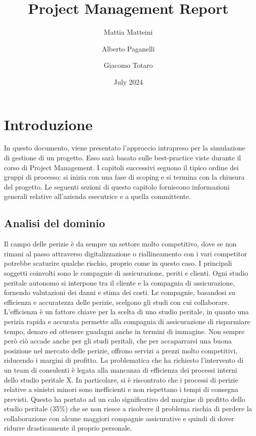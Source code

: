 \documentclass[a4paper,12pt, openright]{report}
\title{Project Management Report}
\author{
    Mattia Matteini \\ \emailaddr{mattia.matteini@studio.unibo.it}
    \and
    Alberto Paganelli \\ \emailaddr{alberto.paganelli3@studio.unibo.it}
    \and
    Giacomo Totaro \\ \emailaddr{giacomo.totaro2@studio.unibo.it}
}
\date{July 2024}
\begin{document}
\maketitle

\tableofcontents

\clearpage


\chapter{Introduzione}
In questo documento, viene presentato l'approccio intrapreso per la simulazione di gestione di un progetto. Esso sarà basato sulle best-practice viste durante il corso di Project Management.
I capitoli successivi seguono il tipico ordine dei gruppi di processo: si inizia con una fase di scoping e si termina con la chiusura del progetto.
Le seguenti sezioni di questo capitolo forniscono informazioni generali relative all’azienda esecutrice e a quella committente.

\section{Analisi del dominio}

Il campo delle perizie è da sempre un settore molto competitivo, dove se non rimani al passo attraverso digitalizzazione o riallineamento con i vari competitor potrebbe scaturire qualche rischio, proprio come in questo caso. I principali soggetti coinvolti sono le compagnie di assicurazione, periti e clienti.
Ogni studio peritale autonomo si interpone tra il cliente e la compagnia di assicurazione, fornendo valutazioni dei danni e stima dei costi.
Le compagnie, basandosi su efficienza e accuratezza delle perizie, scelgono gli studi con cui collaborare. 
L'efficienza è un fattore chiave per la scelta di uno studio peritale, in quanto una perizia rapida e accurata permette alla compagnia di assicurazione di risparmiare tempo, denaro ed ottenere guadagni anche in termini di immagine. Non sempre però ciò accade anche per gli studi peritali, che per accaparrarsi una buona posizione nel mercato delle perizie, offrono servizi a prezzi molto competitivi, riducendo i margini di profitto.
La problematica che ha richiesto l'intervento di un team di consulenti è legata alla mancanza di efficienza dei processi interni dello studio peritale X. In particolare, si è riscontrato che i processi di perizie relative a sinistri minori sono inefficienti e non rispettano i tempi di consegna previsti. Questo ha portato ad un calo significativo del margine di profitto dello studio peritale (35\%) che se non riesce a risolvere il problema rischia di perdere la collaborazione con alcune maggiori compagnie assicurative e quindi di dover ridurre drasticamente il proprio personale.
\end{document}
